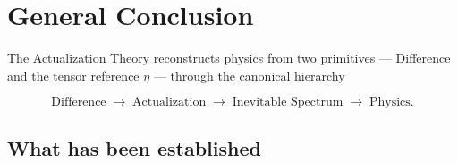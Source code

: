 
\chapter*{General Conclusion}
\label{concl:conclusion}

The Actualization Theory reconstructs physics from two primitives --- Difference and the
tensor reference $\eta$ --- through the canonical hierarchy

\[
\text{Difference} \;\longrightarrow\; \text{Actualization}
\;\longrightarrow\; \text{Inevitable Spectrum} \;\longrightarrow\; \text{Physics}.
\]

\section*{What has been established}

